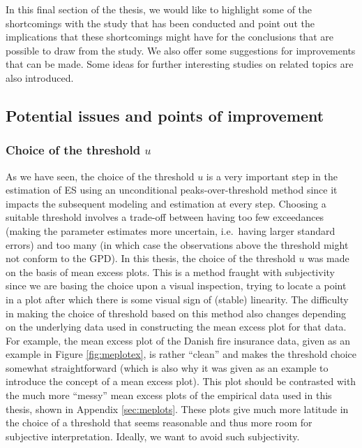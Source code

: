 \documentclass[a4paper,11pt]{article}
\theoremstyle{definition}
\theoremstyle{definition}
\theoremstyle{definition}
\theoremstyle{definition}
\theoremstyle{remark}
\begin{document}
In this final section of the thesis, we would like to highlight some of the shortcomings with the study that has been conducted and point out the implications that these shortcomings might have for the conclusions that are possible to draw from the study. We also offer some suggestions for improvements that can be made. Some ideas for further interesting studies on related topics are also introduced.

\hypertarget{potential-issues-and-points-of-improvement}{%
\subsection{Potential issues and points of improvement}\label{potential-issues-and-points-of-improvement}}

\hypertarget{choice-of-the-threshold-u}{%
\subsubsection{\texorpdfstring{Choice of the threshold \(u\)}{Choice of the threshold u}}\label{choice-of-the-threshold-u}}

As we have seen, the choice of the threshold \(u\) is a very important step in the estimation of ES using an unconditional peaks-over-threshold method since it impacts the subsequent modeling and estimation at every step. Choosing a suitable threshold involves a trade-off between having too few exceedances (making the parameter estimates more uncertain, i.e.~having larger standard errors) and too many (in which case the observations above the threshold might not conform to the GPD). In this thesis, the choice of the threshold \(u\) was made on the basis of mean excess plots. This is a method fraught with subjectivity since we are basing the choice upon a visual inspection, trying to locate a point in a plot after which there is some visual sign of (stable) linearity. The difficulty in making the choice of threshold based on this method also changes depending on the underlying data used in constructing the mean excess plot for that data. For example, the mean excess plot of the Danish fire insurance data, given as an example in Figure \ref{fig:meplotex}, is rather ``clean'' and makes the threshold choice somewhat straightforward (which is also why it was given as an example to introduce the concept of a mean excess plot). This plot should be contrasted with the much more ``messy'' mean excess plots of the empirical data used in this thesis, shown in Appendix \ref{sec:meplots}. These plots give much more latitude in the choice of a threshold that seems reasonable and thus more room for subjective interpretation. Ideally, we want to avoid such subjectivity.
\end{document}
